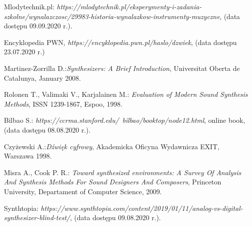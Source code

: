 \documentclass[nostrict]{szablonPG}
\begin{document}



	\setcounter{page}{3}
	\let\cleardoublepage\clearpage
	
	
	\tableofcontents    %
	
%	
	
	
	
	
	
	
	
%	
	
	
%	
%	
	

	\listoffigures      %
	\listoftables

	\begin{thebibliography}{20}                      %
		\small              %
		Mlodytechnik.pl: \emph{https://mlodytechnik.pl/eksperymenty-i-zadania-szkolne/wynalazczosc/29983-historia-wynalazkow-instrumenty-muzyczne}, (data dostępu 09.09.2020 r.).
		
		Encyklopedia PWN, \emph{https://encyklopedia.pwn.pl/haslo/dzwiek}, (data dostępu 23.07.2020 r.)
		
		Martinez-Zorrilla D.:\emph{Synthesizers: A Brief Introduction}, Universitat Oberta de Catalunya, January 2008.

		Rolonen T., Valimaki V., Karjalainen M.: \emph{Evaluation of Modern Sound Synthesis Methods}, ISSN 1239-1867, Espoo, 1998.

		Bilbao S.: \emph{https://ccrma.stanford.edu/~bilbao/booktop/node12.html}, online book, (data dostępu 08.08.2020 r.).
		
		Czyżewski A.:\emph{Dźwięk cyfrowy}, Akademicka Oficyna Wydawnicza EXIT, Warszawa 1998.
		 
		Misra A., Cook P. R.: \emph{Toward synthesized environments: A Survey Of Analysis And Synthesis Methods For Sound Designers And Composers}, Princeton University, Departament of Computer Science, 2009.
		
		Synthtopia: \emph{https://www.synthtopia.com/content/2019/01/11/analog-vs-digital-synthesizer-blind-test/}, (data dostępu 09.08.2020 r.).


\end{thebibliography}
\end{document}

